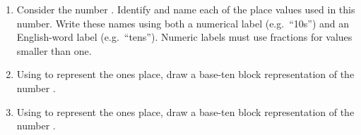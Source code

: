 
\begin{enumerate}
    \item Consider the number . Identify and name each of the place values used in this number. Write these names using both a numerical label (e.g.\ ``10s'') and an English-word label (e.g.\ ``tens'').
Numeric labels must use fractions for values smaller than one.


    \vspace{20pt}
    \begin{ansenv}
    \end{ansenv}
    \vfill

    \item Using  to represent the ones place, draw a base-ten block representation of the number .

    \vspace{20pt}
    \begin{ansenv}
    \end{ansenv}
    \vfill

    \item Using  to represent the ones place, draw a base-ten block representation of the number .

    \vspace{20pt}
    \begin{ansenv}
    \end{ansenv}
    \vfill
\end{enumerate}
